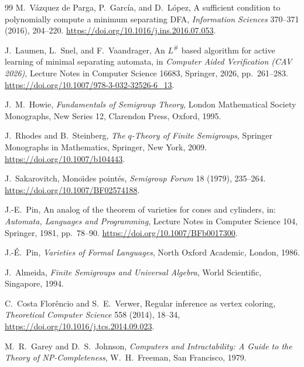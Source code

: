 \documentclass[10pt,a4paper]{article}
\theoremstyle{definition}
\theoremstyle{remark}
\begin{document}
\begin{thebibliography}{99}
M.~V\'azquez de Parga, P.~Garc\'ia, and D.~L\'opez,
\newblock A sufficient condition to polynomially compute a minimum separating DFA,
\newblock \emph{Information Sciences} 370--371 (2016), 204--220.
\newblock \url{https://doi.org/10.1016/j.ins.2016.07.053}.

J.~Laumen, L.~Snel, and F.~Vaandrager,
\newblock An $L^{\#}$ based algorithm for active learning of minimal separating automata,
\newblock in \emph{Computer Aided Verification (CAV 2026)},
Lecture Notes in Computer Science 16683, Springer, 2026, pp.~261--283.
\newblock \url{https://doi.org/10.1007/978-3-032-32526-6_13}.







J.~M.~Howie,
\newblock \emph{Fundamentals of Semigroup Theory},
\newblock London Mathematical Society Monographs, New Series 12,
Clarendon Press, Oxford, 1995.

J.~Rhodes and B.~Steinberg,
\newblock \emph{The $q$-Theory of Finite Semigroups},
\newblock Springer Monographs in Mathematics, Springer, New York, 2009.
\newblock \url{https://doi.org/10.1007/b104443}.

J.~Sakarovitch,
\newblock Mono\"{\i}des point\'es,
\newblock \emph{Semigroup Forum} 18 (1979), 235--264.
\newblock \url{https://doi.org/10.1007/BF02574188}.

J.-E.~Pin,
\newblock An analog of the theorem of varieties for cones and cylinders,
\newblock in: \emph{Automata, Languages and Programming}, Lecture Notes in
Computer Science 104, Springer, 1981, pp.~78--90.
\newblock \url{https://doi.org/10.1007/BFb0017300}.

J.-\'E.~Pin,
\newblock \emph{Varieties of Formal Languages},
\newblock North Oxford Academic, London, 1986.

J.~Almeida,
\newblock \emph{Finite Semigroups and Universal Algebra},
\newblock World Scientific, Singapore, 1994.


C.~Costa Flor\^encio and S.~E.~Verwer,
\newblock Regular inference as vertex coloring,
\newblock \emph{Theoretical Computer Science} 558 (2014), 18--34,
\newblock \url{https://doi.org/10.1016/j.tcs.2014.09.023}.

M.~R.~Garey and D.~S.~Johnson,
\newblock \emph{Computers and Intractability: A Guide to the Theory of
NP-Completeness},
\newblock W.~H.~Freeman, San Francisco, 1979.




\end{thebibliography}
\end{document}
